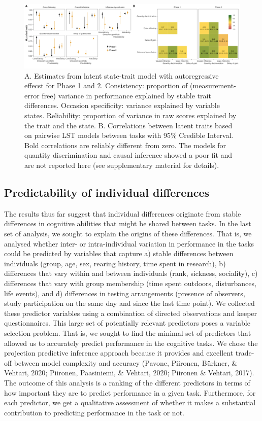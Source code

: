 \documentclass[
  man,floatsintext]{apa6}
\begin{document}
\begin{figure}
\includegraphics[width=1\linewidth]{./figures/lstm} \caption{A. Estimates from latent state-trait model with autoregressive effecst for Phase 1 and 2. Consistency: proportion of (measurement-error free) variance in performance explained by stable trait differences. Occasion specificity: variance explained by variable states. Reliability: proportion of variance in raw scores explained by the trait and the state. B. Correlations between latent traits based on pairwise LST models between tasks with 95\% Credible Interval. Bold correlations are reliably different from zero. The models for quantity discrimination and causal inference showed a poor fit and are not reported here (see supplementary material for details).}\label{fig:lstmplot}
\end{figure}

\hypertarget{predictability-of-individual-differences}{%
\subsection{Predictability of individual differences}\label{predictability-of-individual-differences}}

The results thus far suggest that individual differences originate from stable differences in cognitive abilities that might be shared between tasks. In the last set of analysis, we sought to explain the origins of these differences. That is, we analysed whether inter- or intra-individual variation in performance in the tasks could be predicted by variables that capture a) stable differences between individuals (group, age, sex, rearing history, time spent in research), b) differences that vary within and between individuals (rank, sickness, sociality), c) differences that vary with group membership (time spent outdoors, disturbances, life events), and d) differences in testing arrangements (presence of observers, study participation on the same day and since the last time point). We collected these predictor variables using a combination of directed observations and keeper questionnaires. This large set of potentially relevant predictors poses a variable selection problem. That is, we sought to find the minimal set of predictors that allowed us to accurately predict performance in the cognitive tasks. We chose the projection predictive inference approach because it provides and excellent trade-off between model complexity and accuracy (Pavone, Piironen, Bürkner, \& Vehtari, 2020; Piironen, Paasiniemi, \& Vehtari, 2020; Piironen \& Vehtari, 2017). The outcome of this analysis is a ranking of the different predictors in terms of how important they are to predict performance in a given task. Furthermore, for each predictor, we get a qualitative assessment of whether it makes a substantial contribution to predicting performance in the task or not.
\end{document}
